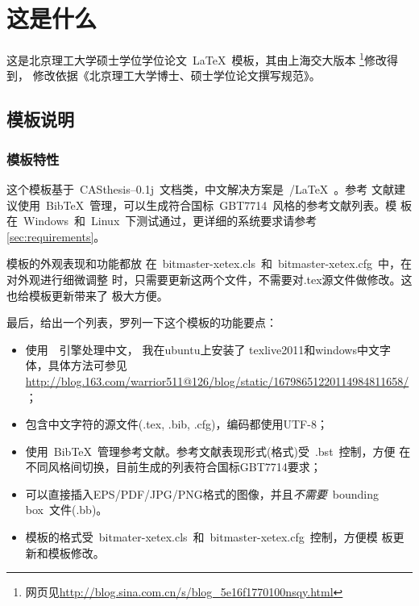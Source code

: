 
\chapter{这是什么}
\label{chap:what}

这是北京理工大学硕士学位学位论文~\LaTeX~模板，其由上海交大版本
\footnote{网页见\url{http://blog.sina.com.cn/s/blog_5e16f1770100nsqy.html}}修改得到，
修改依据《北京理工大学博士、硕士学位论文撰写规范》。

\section{模板说明}
\label{sec:fastguide}

\subsection{模板特性}
\label{sec:features}

这个模板基于~CASthesis--0.1j~文档类，中文解决方案是~\XeTeX/\LaTeX~。参考
文献建议使用~BibTeX~管理，可以生成符合国标~GBT7714~风格的参考文献列表。模
板在~Windows~和~Linux~下测试通过，更详细的系统要求请参考
\ref{sec:requirements}。

模板的外观表现和功能都放
在~bitmaster-xetex.cls~和~bitmaster-xetex.cfg~中，在对外观进行细微调整
时，只需要更新这两个文件，不需要对.tex源文件做修改。这也给模板更新带来了
极大方便。

最后，给出一个列表，罗列一下这个模板的功能要点：

\begin{itemize}
\item \inv  使用~\XeTeX~引擎处理中文，{\color{red} 我在ubuntu上安装了
  texlive2011和windows中文字体，具体方法可参见\url{http://blog.163.com/warrior511@126/blog/static/16798651220114984811658/}}；
\item \inv 包含中文字符的源文件(.tex, .bib, .cfg)，编码都使用UTF-8；
\item \inv 使用~BibTeX~管理参考文献。参考文献表现形式(格式)受~.bst~控制，方便
  在不同风格间切换，目前生成的列表符合国标GBT7714要求；
\item \inv 可以直接插入EPS/PDF/JPG/PNG格式的图像，并且\emph{不需要}~bounding box~文件(.bb)。
\item \inv 模板的格式受~bitmater-xetex.cls~和~bitmaster-xetex.cfg~控制，方便模
  板更新和模板修改。
\end{itemize}

